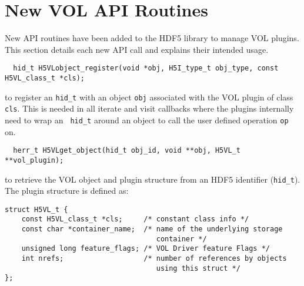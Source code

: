 \section{New VOL API Routines}
New API routines have been added to the HDF5 library to manage VOL plugins. This section details each new API call and explains their intended usage. 

\begin{lstlisting}
  hid_t H5VLobject_register(void *obj, H5I_type_t obj_type, const H5VL_class_t *cls);
\end{lstlisting}
to register an {\tt hid\_t} with an object {\tt obj} associated with
the VOL plugin of class {\tt cls}. This is needed in all iterate and
visit callbacks where the plugins internally need to wrap an {\tt
  hid\_t} around an object to call the user defined operation {\tt op}
on.

\begin{lstlisting}
  herr_t H5VLget_object(hid_t obj_id, void **obj, H5VL_t **vol_plugin);
\end{lstlisting}
to retrieve the VOL object and plugin structure from an HDF5
identifier ({\tt hid\_t}). The plugin structure is defined as:
\begin{lstlisting}
struct H5VL_t {
    const H5VL_class_t *cls;     /* constant class info */
    const char *container_name;  /* name of the underlying storage 
                                    container */
    unsigned long feature_flags; /* VOL Driver feature Flags */
    int nrefs;                   /* number of references by objects
                                    using this struct */
};
\end{lstlisting}



